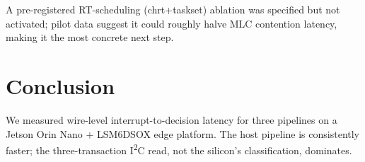 A pre-registered RT-scheduling (chrt+taskset) ablation was specified but not activated; pilot data suggest it could roughly halve MLC contention latency, making it the most concrete next step.


\section{Conclusion}

We measured wire-level interrupt-to-decision latency for three pipelines on a Jetson Orin Nano + LSM6DSOX edge platform. The host pipeline is consistently faster; the three-transaction I\textsuperscript{2}C read, not the silicon's classification, dominates.
